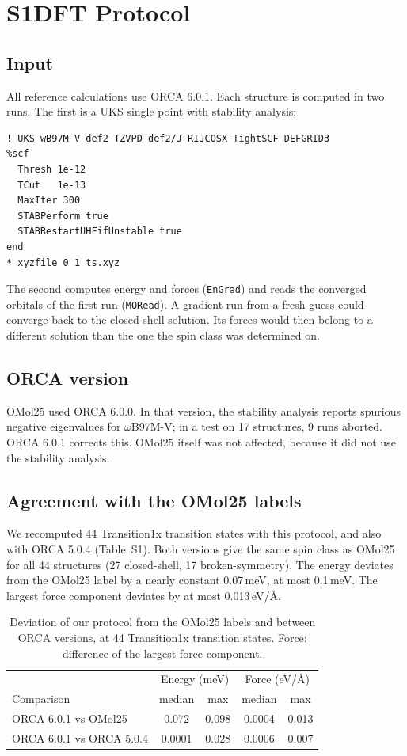 \section{S1\quad DFT Protocol}

\subsection*{Input}
All reference calculations use ORCA 6.0.1. Each structure is computed in two runs. The first is a UKS single point with stability analysis:

\begin{verbatim}
! UKS wB97M-V def2-TZVPD def2/J RIJCOSX TightSCF DEFGRID3
%scf
  Thresh 1e-12
  TCut   1e-13
  MaxIter 300
  STABPerform true
  STABRestartUHFifUnstable true
end
* xyzfile 0 1 ts.xyz
\end{verbatim}

The second computes energy and forces (\texttt{EnGrad}) and reads the converged orbitals of the first run (\texttt{MORead}). A gradient run from a fresh guess could converge back to the closed-shell solution. Its forces would then belong to a different solution than the one the spin class was determined on.

\subsection*{ORCA version}
OMol25 used ORCA 6.0.0\cite{omol25}. In that version, the stability analysis reports spurious negative eigenvalues for $\omega$B97M-V; in a test on 17 structures, 9 runs aborted. ORCA 6.0.1 corrects this. OMol25 itself was not affected, because it did not use the stability analysis.

\subsection*{Agreement with the OMol25 labels}
We recomputed 44 Transition1x transition states with this protocol, and also with ORCA 5.0.4 (Table~S1). Both versions give the same spin class as OMol25 for all 44 structures (27 closed-shell, 17 broken-symmetry). The energy deviates from the OMol25 label by a nearly constant 0.07\,meV, at most 0.1\,meV. The largest force component deviates by at most 0.013\,eV/\AA{}.

\begin{table}[h]
  \caption{Deviation of our protocol from the OMol25 labels and between ORCA versions, at 44 Transition1x transition states. Force: difference of the largest force component.}
  \label{tab:S1}
  \begin{tabular}{lcccc}
    \hline
    & \multicolumn{2}{c}{Energy (meV)} & \multicolumn{2}{c}{Force (eV/\AA)} \\
    Comparison & median & max & median & max \\
    \hline
    ORCA 6.0.1 vs OMol25      & 0.072  & 0.098 & 0.0004 & 0.013 \\
    ORCA 6.0.1 vs ORCA 5.0.4  & 0.0001 & 0.028 & 0.0006 & 0.007 \\
    \hline
  \end{tabular}
\end{table}


